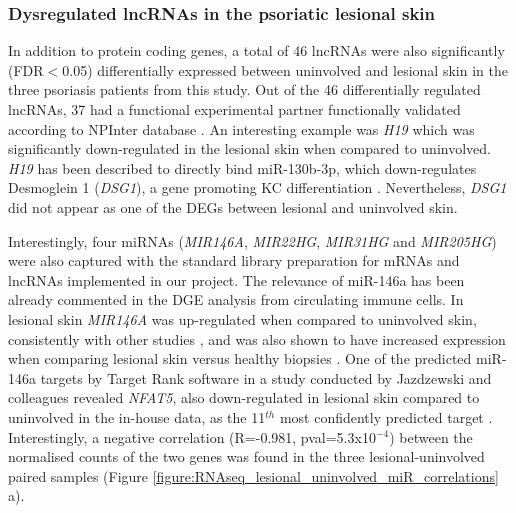 
\subsubsection{Dysregulated lncRNAs in the psoriatic lesional skin}

In addition to protein coding genes, a total of 46 lncRNAs were also significantly (FDR$<$0.05) differentially expressed between uninvolved and lesional skin in the three psoriasis patients from this study. Out of the 46 differentially regulated lncRNAs, 37 had a functional experimental partner functionally validated according to NPInter database \parencite{Hao2016}. An interesting  example was \textit{H19} which was significantly down-regulated in the lesional skin when compared to uninvolved. \textit{H19} has been described to directly bind miR-130b-3p, which down-regulates Desmoglein 1 (\textit{DSG1}), a gene promoting KC differentiation \parencite{Li2017}. Nevertheless, \textit{DSG1} did not appear as one of the DEGs between lesional and uninvolved skin. %

Interestingly, four miRNAs (\textit{MIR146A}, \textit{MIR22HG}, \textit{MIR31HG} and \textit{MIR205HG}) were also captured with the standard library preparation for mRNAs and lncRNAs implemented in our project. The relevance of miR-146a has been already commented in the DGE analysis from circulating immune cells. In lesional skin \textit{MIR146A} was up-regulated when compared to uninvolved skin, consistently with other studies \parencite{Lerman2014, Tsoi2015}, and was also shown to have increased expression when comparing lesional skin versus healthy biopsies \parencite{Li2014}. One of the predicted miR-146a targets by Target Rank software in a study conducted by Jazdzewski and colleagues revealed \textit{NFAT5}, also down-regulated in lesional skin compared to uninvolved in the in-house data, as the 11$^{th}$ most confidently predicted target \parencite{Jazdzewski2009}. Interestingly, a negative correlation (R=-0.981, pval=5.3x10$^{-4}$) between the normalised counts of the two genes was found in the three lesional-uninvolved paired samples (Figure \ref{figure:RNAseq_lesional_uninvolved_miR_correlations} a).


